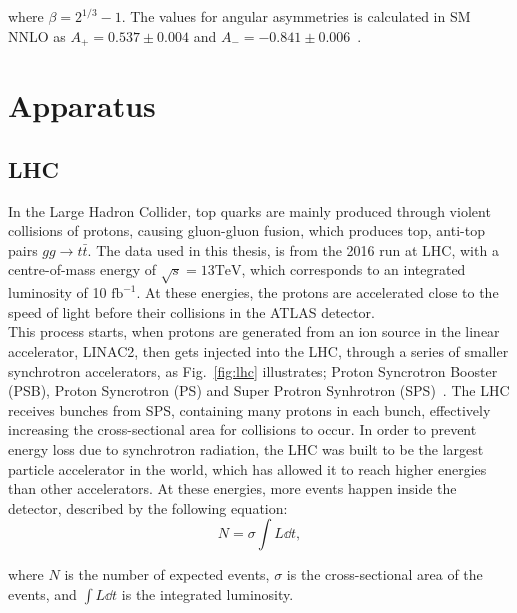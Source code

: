 \documentclass[12pt,a4paper]{article}
\numberwithin{equation}{section}
\begin{document}
where $\beta = 2^{1/3}-1$. The values for angular asymmetries is calculated in SM
NNLO as $A_+=0.537 \pm 0.004$ and
$A_-=-0.841 \pm 0.006$~\cite[24]{CastroNunesFiolhais:1544047}.

\section{Apparatus}
\subsection{LHC}
In the Large Hadron Collider, top quarks are mainly produced through violent
collisions of protons, causing gluon-gluon fusion, which produces top, anti-top
pairs $gg \rightarrow t\bar t$. The data used in this thesis, is from the 2016 run at LHC,
with a centre-of-mass energy of $\sqrt s = 13 \mathrm{TeV}$, which corresponds
to an integrated luminosity of 10 $\mathrm{fb}^{-1}$\cite{oreach2020}. At these
energies, the protons are accelerated close to the speed of light before their
collisions in the ATLAS detector.\\

This process starts, when protons are generated from an ion source in the linear
accelerator, LINAC2, then gets injected into the LHC, through a series of
smaller synchrotron accelerators, as Fig.~\ref{fig:lhc} illustrates; Proton
Syncrotron Booster (PSB), Proton Syncrotron (PS) and Super Protron Synhrotron
(SPS)~\cite[135]{Evans_2008}. The LHC receives bunches from SPS, containing many
protons in each bunch, effectively increasing the cross-sectional area for
collisions to occur. In order to prevent energy loss due to synchrotron
radiation, the LHC was built to be the largest particle accelerator in the
world, which has allowed it to reach higher energies than other accelerators. At
these energies, more events happen inside the detector, described by the
following equation:
\begin{equation}
  N = \sigma \int L \dd t,
\end{equation}

where $N$ is the number of expected events, $\sigma$ is the cross-sectional area of
the events, and $\int L \dd t$ is the integrated luminosity.
\end{document}
